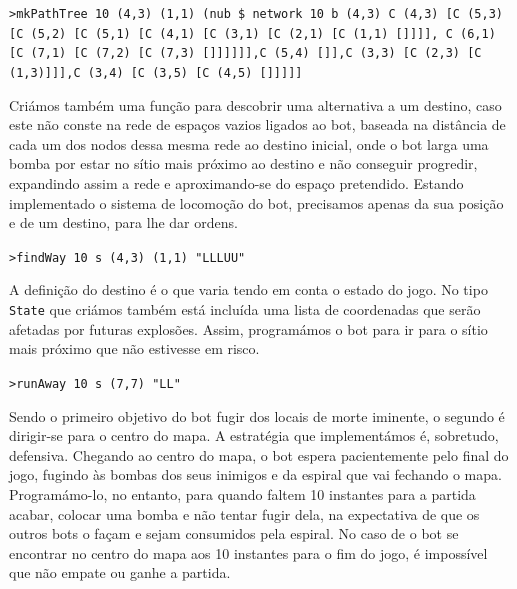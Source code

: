 \documentclass[a4paper]{article}
\begin{document}
    \texttt{>mkPathTree 10 (4,3) (1,1) (nub \$ network 10 b (4,3) \break
    C (4,3) [C (5,3) [C (5,2) [C (5,1) [C (4,1) [C (3,1) [C (2,1) [C (1,1) []]]],\break
    C (6,1) [C (7,1) [C (7,2) [C (7,3) []]]]]],C (5,4) []],C (3,3) [C (2,3) [C (1,3)\break
     [C (1,2) [C (1,1) []]]],C (3,4) [C (3,5) [C (4,5) []]]]]
    }
    \linebreak
    
    Criámos também uma função para descobrir uma alternativa a um destino, caso este não conste na rede de espaços vazios 
    ligados ao bot, baseada na distância de cada um dos nodos dessa mesma rede ao destino inicial, onde o bot larga uma
    bomba por estar no sítio mais próximo ao destino e não conseguir progredir, expandindo assim a rede e aproximando-se
    do espaço pretendido. Estando implementado o sistema de locomoção do bot, precisamos apenas da sua posição e de um destino, para lhe dar ordens. \hspace{13cm}
    \linebreak
    
    \texttt{>findWay 10 s (4,3) (1,1) \break
    "LLLUU"
    }
    \linebreak
    
    A definição do destino é o que varia tendo em conta o estado do jogo. No tipo \texttt{State} que criámos também
    está incluída uma lista de coordenadas que serão afetadas por futuras explosões. Assim, programámos o bot para
    ir para o sítio mais próximo que não estivesse em risco.\hspace{12cm}
        \linebreak
    
    \texttt{>runAway 10 s (7,7) \break
    "LL"
    }
    \linebreak
    
    
    Sendo o primeiro objetivo do bot fugir dos locais de morte iminente, o segundo é dirigir-se para o centro do mapa. 
    A estratégia que implementámos é, sobretudo, defensiva. Chegando ao centro do mapa, o bot espera pacientemente pelo
    final do jogo, fugindo às bombas dos seus inimigos e da espiral que vai fechando o mapa. Programámo-lo, no entanto, 
    para quando faltem 10 instantes para a partida acabar, colocar uma bomba e não tentar fugir dela, na expectativa 
    de que os outros bots o façam e sejam consumidos pela espiral. No caso de o bot se encontrar no centro do mapa aos 
    10 instantes para o fim do jogo, é impossível que não empate ou ganhe a partida.

    
    
\end{document}
